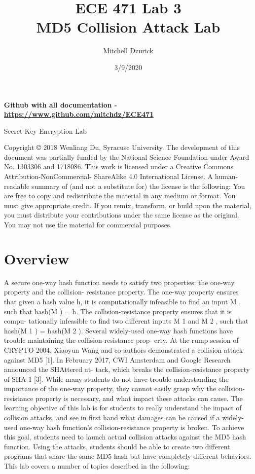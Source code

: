 \documentclass[12pt]{article}
\title {{\bf ECE 471 Lab 3} \\
\large{MD5 Collision Attack Lab}}
\author{Mitchell Dzurick}
\date{3/9/2020}
\begin{document}
\maketitle
\textbf{Github with all documentation - \url{https://www.github.com/mitchdz/ECE471}}
\tableofcontents 

\clearpage


Secret Key Encryption Lab

Copyright © 2018 Wenliang Du, Syracuse University. The development of this document was partially funded by the National
Science Foundation under Award No. 1303306 and 1718086. This work is licensed under a Creative Commons
Attribution-NonCommercial- ShareAlike 4.0 International License. A human-readable summary of (and not a substitute for)
the license is the following: You are free to copy and redistribute the material in any medium or format. You must give
appropriate credit. If you remix, transform, or build upon the material, you must distribute your contributions under the
same license as the original. You may not use the material for commercial purposes.

\section{Overview}

A secure one-way hash function needs to satisfy two properties: the one-way property and the collision-
resistance property. The one-way property ensures that given a hash value h, it is computationally infeasible
to find an input M , such that hash(M ) = h. The collision-resistance property ensures that it is compu-
tationally infeasible to find two different inputs M 1 and M 2 , such that hash(M 1 ) = hash(M 2 ).
Several widely-used one-way hash functions have trouble maintaining the collision-resistance prop-
erty. At the rump session of CRYPTO 2004, Xiaoyun Wang and co-authors demonstrated a collision attack
against MD5 [1]. In February 2017, CWI Amsterdam and Google Research announced the SHAttered at-
tack, which breaks the collision-resistance property of SHA-1 [3]. While many students do not have trouble
understanding the importance of the one-way property, they cannot easily grasp why the collision-resistance
property is necessary, and what impact these attacks can cause.
The learning objective of this lab is for students to really understand the impact of collision attacks, and
see in first hand what damages can be caused if a widely-used one-way hash function’s collision-resistance
property is broken. To achieve this goal, students need to launch actual collision attacks against the MD5
hash function. Using the attacks, students should be able to create two different programs that share the
same MD5 hash but have completely different behaviors. This lab covers a number of topics described in
the following:
\end{document}
